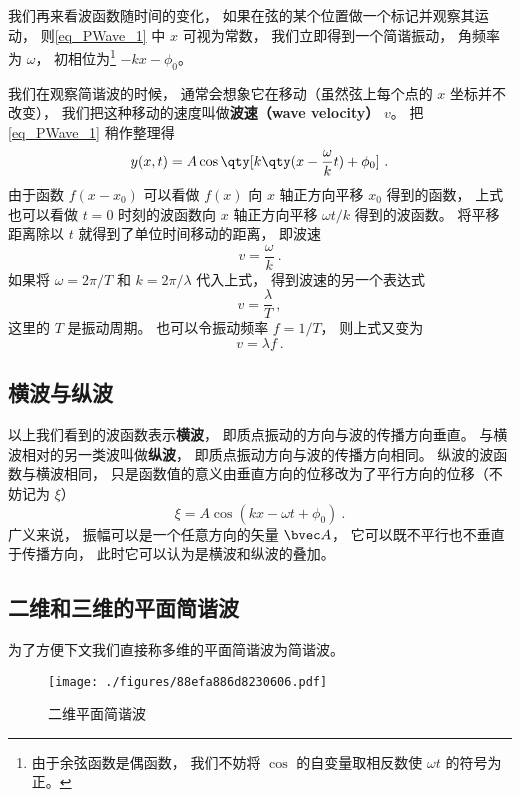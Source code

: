 我们再来看波函数随时间的变化， 如果在弦的某个位置做一个标记并观察其运动， 则\autoref{eq_PWave_1} 中 $x$ 可视为常数， 我们立即得到一个简谐振动， 角频率为 $\omega$， 初相位为\footnote{由于余弦函数是偶函数， 我们不妨将 $\cos$ 的自变量取相反数使 $\omega t$ 的符号为正。} $-kx - \phi_0$。

我们在观察简谐波的时候， 通常会想象它在移动（虽然弦上每个点的 $x$ 坐标并不改变）， 我们把这种移动的速度叫做\textbf{波速（wave velocity）} $v$。 把\autoref{eq_PWave_1} 稍作整理得
\begin{equation}
y(x, t) = A\cos \qty[k \qty(x - \frac{\omega}{k} t) + \phi_0]~.
\end{equation}
由于函数 $f(x - x_0)$ 可以看做 $f(x)$ 向 $x$ 轴正方向平移 $x_0$ 得到的函数， 上式也可以看做 $t = 0$ 时刻的波函数向 $x$ 轴正方向平移 $\omega t/k$ 得到的波函数。 将平移距离除以 $t$ 就得到了单位时间移动的距离， 即波速
\begin{equation}
v = \frac{\omega}{k}~.
\end{equation}
如果将 $\omega = 2\pi/T$ 和 $k = 2\pi/\lambda$ 代入上式， 得到波速的另一个表达式
\begin{equation}
v = \frac{\lambda}{T}~,
\end{equation}
这里的 $T$ 是振动周期。 也可以令振动频率 $f = 1/T$， 则上式又变为
\begin{equation}
v = \lambda f~.
\end{equation}

\subsection{横波与纵波}
以上我们看到的波函数表示\textbf{横波}， 即质点振动的方向与波的传播方向垂直。 与横波相对的另一类波叫做\textbf{纵波}， 即质点振动方向与波的传播方向相同。 纵波的波函数与横波相同， 只是函数值的意义由垂直方向的位移改为了平行方向的位移（不妨记为 $\xi$）
\begin{equation}
\xi = A \cos(k x - \omega t + \phi_0)~.
\end{equation}
广义来说， 振幅可以是一个任意方向的矢量 $\bvec A$， 它可以既不平行也不垂直于传播方向， 此时它可以认为是横波和纵波的叠加。

\subsection{二维和三维的平面简谐波}
为了方便下文我们直接称多维的平面简谐波为简谐波。

\begin{figure}[ht]
\centering
\texttt{[image: ./figures/88efa886d8230606.pdf]}
\caption{二维平面简谐波} \label{fig_PWave_2}
\end{figure}

